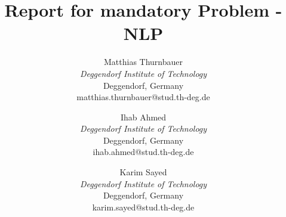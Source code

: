 \documentclass[onecolumn]{article}
\begin{document}
\title{Report for mandatory Problem - NLP}

\author{
Matthias Thurnbauer\\
\textit{Deggendorf Institute of Technology} \\
Deggendorf, Germany \\
matthias.thurnbauer@stud.th-deg.de
\and
Ihab Ahmed\\
\textit{Deggendorf Institute of Technology} \\
Deggendorf, Germany \\
ihab.ahmed@stud.th-deg.de
\and
Karim Sayed\\
\textit{Deggendorf Institute of Technology} \\
Deggendorf, Germany \\
karim.sayed@stud.th-deg.de
}

\maketitle





\printbibliography
\end{document}
